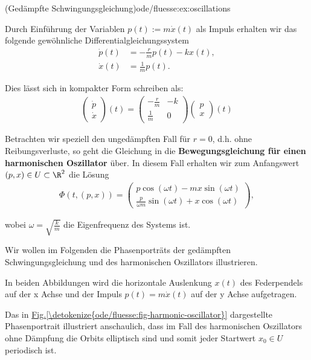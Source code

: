 \documentclass[letterpaper,10pt,english]{jupyterBook}
\begin{document}
\begin{example}{(Gedämpfte Schwingungsgleichung)}{ode/fluesse:ex:oscillations}
\par
Durch Einführung der Variablen \(p(t):= m\dot{x}(t)\) als Impuls erhalten wir das folgende gewöhnliche Differentialgleichungssystem
\begin{align*}
\dot{p}(t) &= - \frac{r}{m}p(t) -kx(t), \\
\dot{x}(t) &= \frac{1}{m}p(t).
\end{align*}
\par
Dies lässt sich in kompakter Form schreiben als:
\begin{align*}
\begin{pmatrix} \dot{p} \\ \dot{x} \end{pmatrix}(t) = \begin{pmatrix} -\frac{r}{m} & -k \\ \frac{1}{m} & 0\end{pmatrix} \begin{pmatrix}p \\ x\end{pmatrix}(t)
\end{align*}
\par
Betrachten wir speziell den ungedämpften Fall für \(r=0\), d.h. ohne Reibungsverluste, so geht die Gleichung in die \textbf{Bewegungsgleichung für einen harmonischen Oszillator} über.
In diesem Fall erhalten wir zum Anfangswert \((p,x) \in U \subset \R^2 \) die Lösung
\begin{align*}
\Phi(t, (p,x)) = 
\begin{pmatrix}
p \cos(\omega t) - m x \sin(\omega t) \\
\frac{p}{\omega m}\sin(\omega t) + x\cos(\omega t)
\end{pmatrix},
\end{align*}
\par
wobei \(\omega=\sqrt{\frac{k}{m}}\) die Eigenfrequenz des Systems ist.
\end{example}

\par
Wir wollen im Folgenden die Phasenporträts der gedämpften Schwingungsgleichung und des harmonischen Oszillators illustrieren.

\par
In beiden Abbildungen wird die horizontale Auslenkung \(x(t)\) des Federpendels auf der x Achse und der Impuls \(p(t) = m\dot{x}(t)\) auf der y Achse aufgetragen.

\par
Das in \hyperref[\detokenize{ode/fluesse:fig-harmonic-oscillator}]{Fig.\@ \ref{\detokenize{ode/fluesse:fig-harmonic-oscillator}}} dargestellte Phasenportrait illustriert anschaulich, dass im Fall des harmonischen Oszillators ohne Dämpfung die Orbits elliptisch sind und somit jeder Startwert \(x_0 \in U\) periodisch ist.
\end{document}

